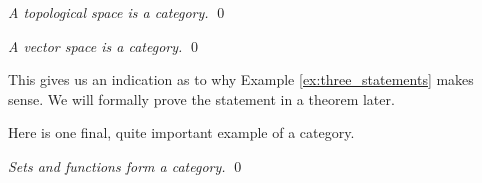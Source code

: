 \documentclass[../thesis.tex]{subfiles}
\begin{document}
\begin{ex}
\label{ex:topological_space}
\textit{A topological space is a category.}
\qed
\end{ex}

\begin{ex}
\label{ex:vector_space}
\textit{A vector space is a category.}
\qed
\end{ex}

This gives us an indication as to why Example \ref{ex:three_statements} makes sense.
We will formally prove the statement in a theorem later.

Here is one final, quite important example of a category.

\begin{ex}
\label{ex:set}
\textit{Sets and functions form a category.}
\qed
\end{ex}
\end{document}
